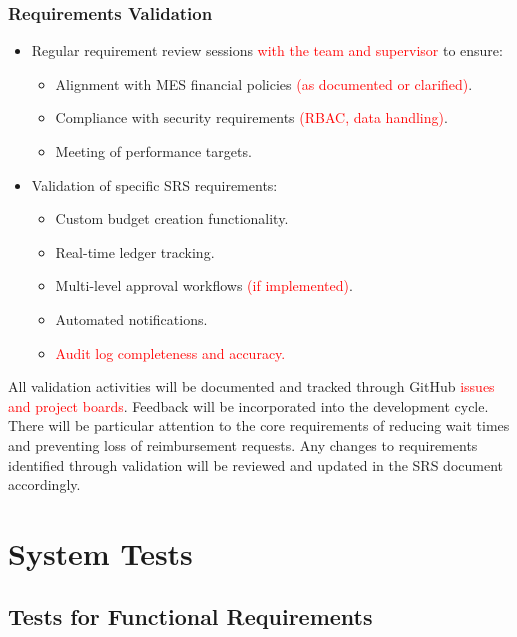 \documentclass[12pt, titlepage]{article}
\begin{document}
\subsubsection*{Requirements Validation}
\begin{itemize}
   \item Regular requirement review sessions \textcolor{red}{with the team and supervisor} to ensure:
   \begin{itemize}
       \item Alignment with MES financial policies \textcolor{red}{(as documented or clarified)}.
       \item Compliance with security requirements \textcolor{red}{(RBAC, data handling)}.
       \item Meeting of performance targets.
   \end{itemize}
   \item Validation of specific SRS requirements:
   \begin{itemize}
       \item Custom budget creation functionality.
       \item Real-time ledger tracking.
       \item Multi-level approval workflows \textcolor{red}{(if implemented)}.
       \item Automated notifications.
       \item \textcolor{red}{Audit log completeness and accuracy.}
   \end{itemize}
\end{itemize}

All validation activities will be documented and tracked through GitHub \textcolor{red}{issues and project boards}. Feedback will be incorporated into the development cycle. There will be particular attention to the core requirements of reducing wait times and preventing loss of reimbursement requests. Any changes to requirements identified through validation will be reviewed and updated in the SRS document accordingly.

\section{System Tests} \label{sec:SystemTests}

\subsection{Tests for Functional Requirements} \label{sec:FuncTests}
\end{document}
